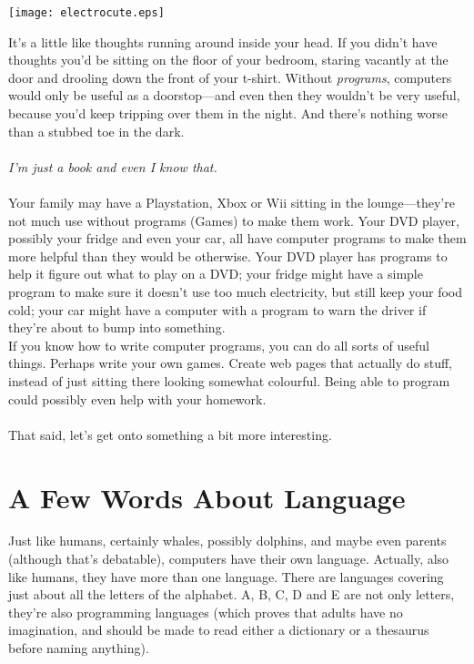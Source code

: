 \begin{center}
\texttt{[image: electrocute.eps]}
\end{center}

It's a little like thoughts running around inside your head. If you didn't have thoughts you'd be sitting on the floor of your bedroom, staring vacantly at the door and drooling down the front of your t-shirt. Without \emph{programs}, computers would only be useful as a doorstop---and even then they wouldn't be very useful, because you'd keep tripping over them in the night.  And there's nothing worse than a stubbed toe in the dark.
\\
\\
\emph{I'm just a book and even I know that.}
\\
\\
Your family may have a Playstation, Xbox or Wii sitting in the lounge---they're not much use without programs (Games) to make them work.  Your DVD player, possibly your fridge and even your car, all have computer programs to make them more helpful than they would be otherwise.  Your DVD player has programs to help it figure out what to play on a DVD; your fridge might have a simple program to make sure it doesn't use too much electricity, but still keep your food cold; your car might have a computer with a program to warn the driver if they're about to bump into something.\\
If you know how to write computer programs, you can do all sorts of useful things. Perhaps write your own games. Create web pages that actually do stuff, instead of just sitting there looking somewhat colourful.  Being able to program could possibly even help with your homework.\\
\\
That said, let's get onto something a bit more interesting.

\section{A Few Words About Language}

Just like humans, certainly whales, possibly dolphins, and maybe even parents (although that's debatable), computers have their own language.  Actually, also like humans, they have more than one language.  There are languages covering just about all the letters of the alphabet.  A, B, C, D and E are not only letters, they're also programming languages (which proves that adults have no imagination, and should be made to read either a dictionary or a thesaurus before naming anything).

